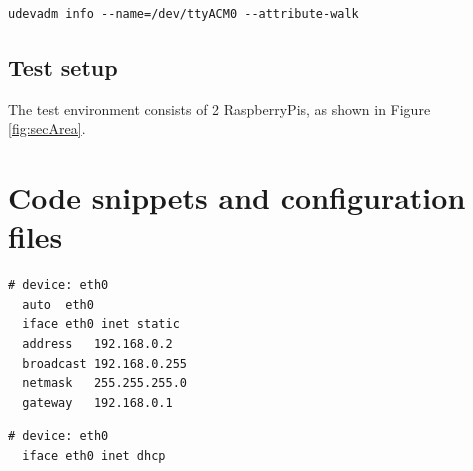 \begin{lstlisting}[style=BashInputStyle,label=lst:udev]
  udevadm info --name=/dev/ttyACM0 --attribute-walk
\end{lstlisting}

\section{Test setup}

The test environment consists of 2 RaspberryPis, as shown in Figure \ref{fig:secArea}. 

\chapter{Code snippets and configuration files}

\begin{lstlisting}[style=BashInputStyle,caption={Raspbian configuration for static ip address},label=lst:staticIP]
# device: eth0
  auto  eth0
  iface eth0 inet static
  address   192.168.0.2
  broadcast 192.168.0.255
  netmask   255.255.255.0
  gateway   192.168.0.1
\end{lstlisting}

\begin{lstlisting}[style=BashInputStyle,caption={Raspbian configuration for dynamic ip address},label=lst:dynamicIP]
# device: eth0
  iface eth0 inet dhcp
\end{lstlisting}





